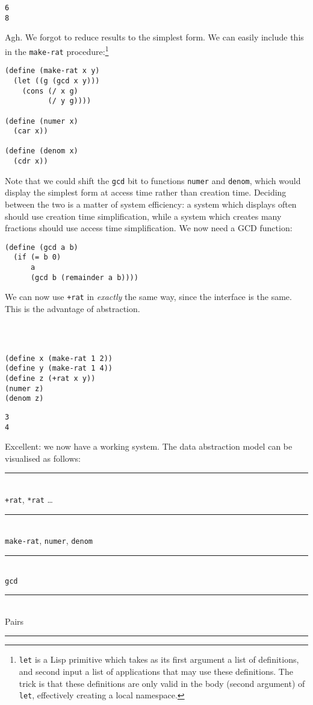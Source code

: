 \documentclass[9pt]{report}
\begin{document}
\begin{verbatim}
6
8
\end{verbatim}


Agh. We forgot to reduce results to the simplest form. We can
easily include this in the \texttt{make-rat} procedure:\footnote{\texttt{let} is a Lisp primitive which takes as its first argument a
list of definitions, and second input a list of applications that may
use these definitions. The trick is that these definitions are only
valid in the body (second argument) of \texttt{let}, effectively creating a
local namespace.}

\begin{verbatim}
(define (make-rat x y)
  (let ((g (gcd x y)))
    (cons (/ x g)
          (/ y g))))

(define (numer x)
  (car x))

(define (denom x)
  (cdr x))
\end{verbatim}

Note that we could shift the \texttt{gcd} bit to functions \texttt{numer} and
\texttt{denom}, which would display the simplest form at access time
rather than creation time. Deciding between the two is a matter of
system efficiency: a system which displays often should use
creation time simplification, while a system which creates many
fractions should use access time simplification.
We now need a GCD function:

\begin{verbatim}
(define (gcd a b)
  (if (= b 0)
      a
      (gcd b (remainder a b))))
\end{verbatim}

We can now use \texttt{+rat} in \emph{exactly} the same way, since the
interface is the same. This is the advantage of abstraction.

\begin{verbatim}



(define x (make-rat 1 2))
(define y (make-rat 1 4))
(define z (+rat x y))
(numer z)
(denom z)
\end{verbatim}

\begin{verbatim}
3
4
\end{verbatim}


Excellent: we now have a working system. The data abstraction
model can be visualised as follows:

\begin{center}
\rule{6cm}{2pt}\\
\texttt{+rat}, \texttt{*rat} \ldots{}\\
\rule{6cm}{2pt}\\
\texttt{make-rat}, \texttt{numer}, \texttt{denom}\\
\rule{6cm}{2pt}\\
\texttt{gcd}\\
\rule{6cm}{2pt}\\
Pairs\\
\rule{6cm}{2pt}
\end{center}
\end{document}
